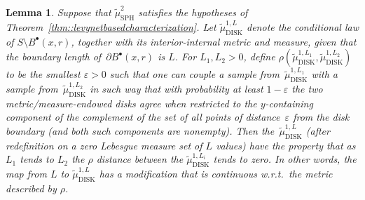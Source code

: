 \documentclass[JEP,XML,SOM,Unicode]{cedram}
\newcommand{\sbullet}{{\scriptscriptstyle\bullet}}
\let\epsilon\varepsilon
\theoremstyle{plain}
\numberwithin{theorem}{section}
\newtheorem{lemma}[theorem]{Lemma}
\theoremstyle{definition}
\newcommand{\tmustwo}{\wt{\mu}_{\mathrm{SPH}}^2}
\newcommand{\tmudonel}{\wt{\mu}_{ \mathrm{DISK}}^{1, L}}
\def\tmudonelset#1{\wt{\mu}_{ \mathrm{DISK}}^{1, #1}}
\let\wt\widetilde
\newcommand{\fb}[2]{B^\sbullet(#1,#2)}
\begin{document}
\begin{lemma}
\label{lem::disklawcontinuity}
Suppose that $\tmustwo$ satisfies the hypotheses of Theorem~\ref{thm::levynetbasedcharacterization}. Let $\tmudonel$ denote the conditional law of $S \setminus \fb{x}{r}$, together with its interior-internal metric and measure, given that the boundary length of~$\partial \fb{x}{r}$ is $L$. For $L_1,L_2 > 0$, define $\rho(\tmudonelset{L_1}, \tmudonelset{L_2})$ to be the smallest $\epsilon > 0$ such that one can couple a sample from~$\tmudonelset{L_1}$ with a sample from~$\tmudonelset{L_2}$ in such way that with probability at least $1-\epsilon$ the two metric/measure-endowed disks agree when restricted to the $y$-containing component of the complement of the set of all points of distance~$\epsilon$ from the disk boundary (and both such components are nonempty). Then the~$\tmudonel$ (after redefinition on a zero Lebesgue measure set of $L$ values) have the property that as $L_1$ tends to $L_2$ the $\rho$ distance between the $\tmudonelset{L_i}$ tends to zero. In other words, the map from $L$ to $\tmudonel$ has a modification that is continuous w.r.t.\ the metric described by $\rho$.
\end{lemma}
\end{document}
